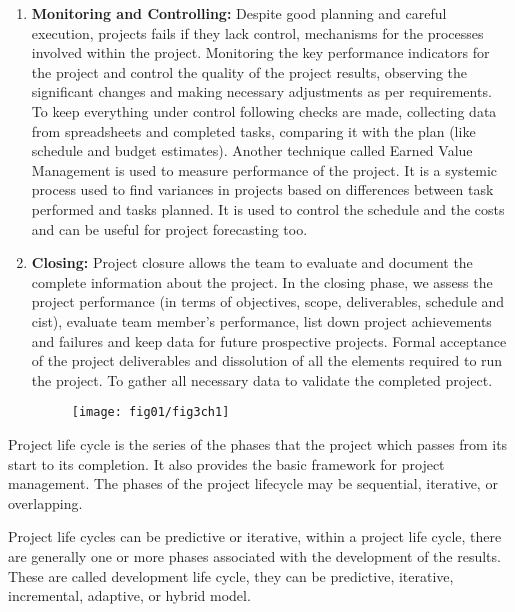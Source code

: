 \begin{enumerate}
    \item \textbf{Monitoring and Controlling:} Despite good planning and careful execution, projects fails if they lack control, mechanisms for the processes involved within the project. Monitoring the key performance indicators for the project and control the quality of the project results, observing the significant changes and making necessary adjustments as per requirements. To keep everything under control following checks are made, collecting data from spreadsheets and completed tasks, comparing it with the plan (like schedule and budget estimates). Another technique called Earned Value Management is used to measure performance of the project. It is a systemic process used to find variances in projects based on differences between task performed and tasks planned. It is used to control the schedule and the costs and can be useful for project forecasting too.

    \item \textbf{Closing:} Project closure allows the team to evaluate and document the complete information about the project. In the closing phase, we assess the project performance (in terms of objectives, scope, deliverables, schedule and cist), evaluate team member’s performance, list down project achievements and failures and keep data for future prospective projects. Formal acceptance of the project deliverables and dissolution of all the elements required to run the project. To gather all necessary data to validate the completed project. 
    
    \begin{figure}
    	\centering
    	\texttt{[image: fig01/fig3ch1]}
    \end{figure}
    

\end{enumerate}


Project life cycle is the series of the phases that the project which passes from its start to its completion. It also provides the basic framework for project management. The phases of the project lifecycle may be sequential, iterative, or overlapping.

Project life cycles can be predictive or iterative, within a project life cycle, there are generally one or more phases associated with the development of the results. These are called development life cycle, they can be predictive, iterative, incremental, adaptive, or hybrid model.


